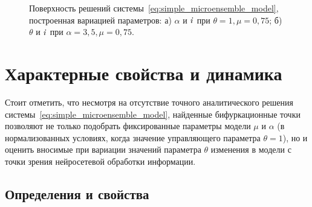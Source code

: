 

\newpage

\newpage
\begin{figure}[ht]
    \caption{Поверхность решений системы~\eqref{eq:simple_microensemble_model}, построенная вариацией параметров: а) $\alpha$ и $\mathit{i}$ при $\theta = 1, \mu = 0,75$; б) $\theta$ и $\mathit{i}$ при $\alpha = 3,5, \mu = 0,75$.}
    \label{fig:analysis_origin_solution_surface}
\end{figure}

\newpage
\section{Характерные свойства и динамика} \label{section:neuron_dynamic}

Стоит отметить, что несмотря на отсутствие точного аналитического решения системы~\eqref{eq:simple_microensemble_model}, найденные бифуркационные точки позволяют не только подобрать фиксированные параметры модели $\mu$ и $\alpha$ (в нормализованных условиях, когда значение управляющего параметра $\theta = 1$), но и оценить вносимые при вариации значений параметра $\theta$ изменения в модели с точки зрения нейросетевой обработки информации.

\subsection{Определения и свойства}

